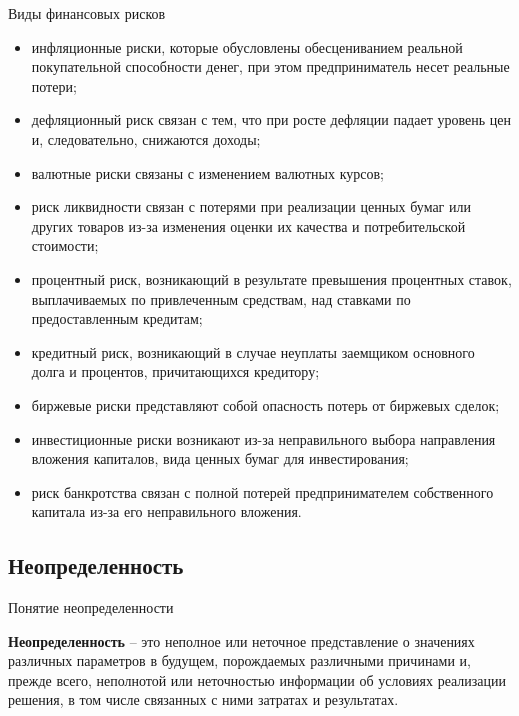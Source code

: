 \documentclass[financial_risks_lectures.tex]{subfiles}
\begin{document}
\begin{frame}[allowframebreaks]{Виды финансовых рисков}
\begin{itemize}
\item
	инфляционные риски, которые обусловлены обесцениванием реальной покупательной способности денег, при этом предприниматель несет реальные потери;
\item
	дефляционный риск связан с тем, что при росте дефляции падает уровень цен и, следовательно, снижаются доходы;
\item
	валютные риски связаны с изменением валютных курсов;
\item
	риск ликвидности связан с потерями при реализации ценных бумаг или других товаров из-за изменения оценки их качества и потребительской стоимости;
\item
	процентный риск, возникающий в результате превышения процентных ставок, выплачиваемых по привлеченным средствам, над ставками по предоставленным кредитам;
\item
	кредитный риск, возникающий в случае неуплаты заемщиком основного долга и процентов, причитающихся кредитору;
\pagebreak
\item
	биржевые риски представляют собой опасность потерь от биржевых сделок;
\item
	инвестиционные риски возникают из-за неправильного выбора направления вложения капиталов, вида ценных бумаг для инвестирования;
\item
	риск банкротства связан с полной потерей предпринимателем собственного капитала из-за его неправильного вложения.
\end{itemize}
\end{frame}


\subsection{Неопределенность}
\begin{frame}{Понятие неопределенности}
\begin{block}{\textbf{Неопределенность}}
\quad – это неполное или неточное представление о значениях различных параметров в будущем, порождаемых различными причинами и, прежде всего, неполнотой или неточностью информации об условиях реализации решения, в том числе связанных с ними затратах и результатах. 
\end{block}

\end{frame}
\end{document}

